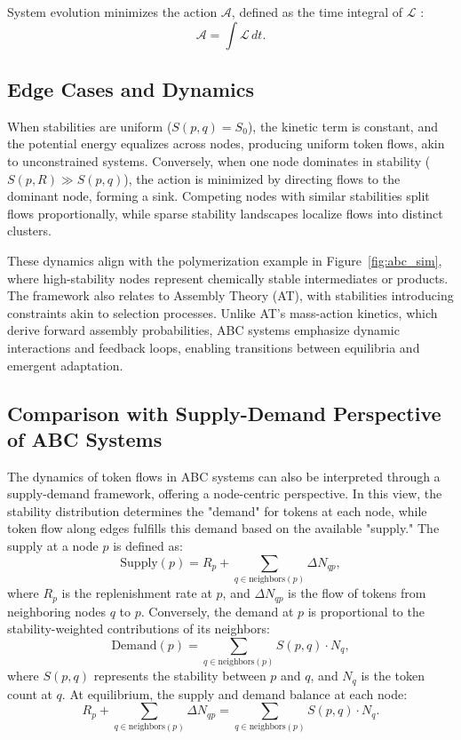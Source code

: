 \documentclass[entropy,article,submit,pdftex,oneauthor]{Definitions/mdpi}
\begin{document}
System evolution minimizes the action \( \mathcal{A} \), defined as the time integral of \( \mathcal{L} \) \cite{goldstein2002classical}:
\begin{equation}
\mathcal{A} = \int \mathcal{L} \, dt.
\label{eq:action}
\end{equation}

\subsection{Edge Cases and Dynamics}
When stabilities are uniform (\( S(p, q) = S_0 \)), the kinetic term is constant, and the potential energy equalizes across nodes, producing uniform token flows, akin to unconstrained systems. Conversely, when one node dominates in stability (\( S(p, R) \gg S(p, q) \)), the action is minimized by directing flows to the dominant node, forming a sink. Competing nodes with similar stabilities split flows proportionally, while sparse stability landscapes localize flows into distinct clusters.

These dynamics align with the polymerization example in Figure~\ref{fig:abc_sim}, where high-stability nodes represent chemically stable intermediates or products. The framework also relates to Assembly Theory (AT), with stabilities introducing constraints akin to selection processes. Unlike AT’s mass-action kinetics, which derive forward assembly probabilities, ABC systems emphasize dynamic interactions and feedback loops, enabling transitions between equilibria and emergent adaptation.

\subsection{Comparison with Supply-Demand Perspective of ABC Systems}

The dynamics of token flows in ABC systems can also be interpreted through a supply-demand framework, offering a node-centric perspective. In this view, the stability distribution determines the "demand" for tokens at each node, while token flow along edges fulfills this demand based on the available "supply." The supply at a node \(p\) is defined as:
\begin{equation}
\text{Supply}(p) = R_p + \sum_{q \in \text{neighbors}(p)} \Delta N_{qp},
\end{equation}
where \(R_p\) is the replenishment rate at \(p\), and \(\Delta N_{qp}\) is the flow of tokens from neighboring nodes \(q\) to \(p\). Conversely, the demand at \(p\) is proportional to the stability-weighted contributions of its neighbors:
\begin{equation}
\text{Demand}(p) = \sum_{q \in \text{neighbors}(p)} S(p, q) \cdot N_q,
\end{equation}
where \(S(p, q)\) represents the stability between \(p\) and \(q\), and \(N_q\) is the token count at \(q\). At equilibrium, the supply and demand balance at each node:
\begin{equation}
R_p + \sum_{q \in \text{neighbors}(p)} \Delta N_{qp} = \sum_{q \in \text{neighbors}(p)} S(p, q) \cdot N_q.
\end{equation}
\end{document}
